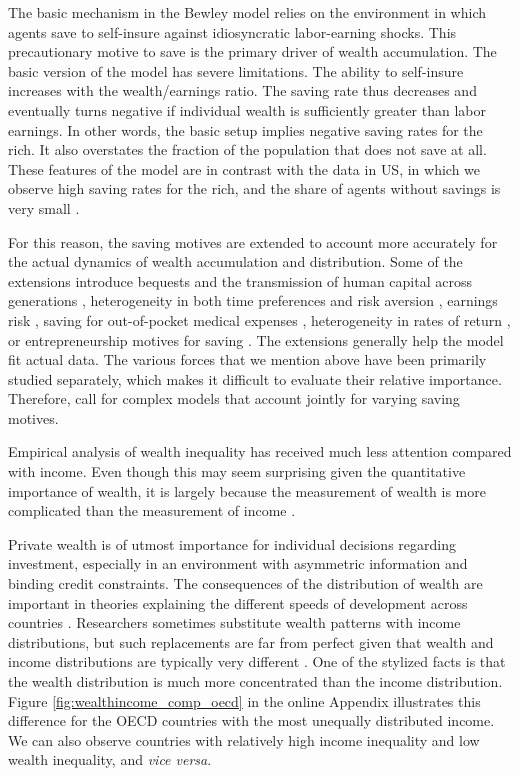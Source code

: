\documentclass[a4paper,11pt]{article}
\begin{document}
The basic mechanism in the Bewley model relies on the environment in which agents save to self-insure against idiosyncratic labor-earning shocks. This precautionary motive to save is the primary driver of wealth accumulation. The basic version of the model has severe limitations. The ability to self-insure increases with the wealth/earnings ratio. The saving rate thus decreases and eventually turns negative if individual wealth is sufficiently greater than labor earnings. In other words, the basic setup implies negative saving rates for the rich. It also overstates the fraction of the population that does not save at all. These features of the model are in contrast with the data in \ac{US}, in which we observe high saving rates for the rich, and the share of agents without savings is very small \citep{DENARDI2017280}. 

For this reason, the saving motives are extended to account more accurately for the actual dynamics of wealth accumulation and distribution. Some of the extensions introduce bequests and the transmission of human capital across generations \citep{nardi2004wealth,de2014bequests}, heterogeneity in both time preferences and risk aversion \citep{HENDRICKS2007}, earnings risk \citep{castaneda2003}, saving for out-of-pocket medical expenses \citep{kopecky2014impact}, heterogeneity in rates of return \citep{lusardi2017optimal,BENHABIB2015489}, or entrepreneurship motives for saving \citep{cagetti2006entrepreneurship}. The extensions generally help the model fit actual data. The various forces that we mention above have been primarily studied separately, which makes it difficult to evaluate their relative importance. Therefore, \citet{DENARDI2017280} call for complex models that account jointly for varying saving motives.

Empirical analysis of wealth inequality has received much less attention compared with income. Even though this may seem surprising given the quantitative importance of wealth, it is largely because the measurement of wealth is more complicated than the measurement of income \citep{zucman2019}.

Private wealth is of utmost importance for individual  decisions regarding investment, especially in an environment with asymmetric information and binding credit constraints. The consequences of the distribution of wealth are important in theories explaining the different speeds of development across countries \citep{roine2015long}. Researchers sometimes substitute wealth patterns with income distributions, but such replacements are far from perfect given that wealth and income distributions are typically very different \citep{bagchi2015does}. One of the stylized facts is that the wealth distribution is much more concentrated than the income distribution. Figure \ref{fig:wealthincome_comp_oecd} in the online Appendix illustrates this difference for the OECD countries with the most unequally distributed income. We can also observe countries with relatively high income inequality and low wealth inequality, and \textit{vice versa}.
\end{document}
